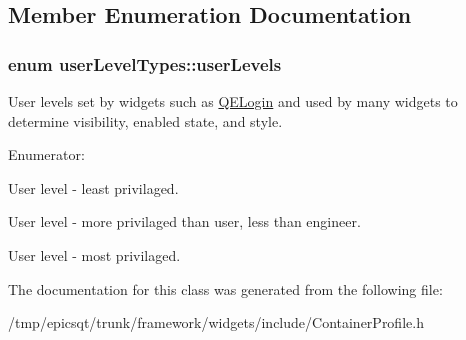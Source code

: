 \subsection{Member Enumeration Documentation}
\hypertarget{classuserLevelTypes_a033cf2a40f620286b1839dd360c8497b}{
\subsubsection[{userLevels}]{\setlength{\rightskip}{0pt plus 5cm}enum {\bf userLevelTypes::userLevels}}}
\label{classuserLevelTypes_a033cf2a40f620286b1839dd360c8497b}
User levels set by widgets such as \hyperlink{classQELogin}{QELogin} and used by many widgets to determine visibility, enabled state, and style. \begin{Desc}
\item[Enumerator: ]\par
\begin{description}
\item[{\em 
\hypertarget{classuserLevelTypes_a033cf2a40f620286b1839dd360c8497baf1de7d906a9db64a2fae68788e26ac26}{
USERLEVEL\_\-USER}
\label{classuserLevelTypes_a033cf2a40f620286b1839dd360c8497baf1de7d906a9db64a2fae68788e26ac26}
}]User level -\/ least privilaged. \item[{\em 
\hypertarget{classuserLevelTypes_a033cf2a40f620286b1839dd360c8497bad543b90d5269054979983b2793f21c14}{
USERLEVEL\_\-SCIENTIST}
\label{classuserLevelTypes_a033cf2a40f620286b1839dd360c8497bad543b90d5269054979983b2793f21c14}
}]User level -\/ more privilaged than user, less than engineer. \item[{\em 
\hypertarget{classuserLevelTypes_a033cf2a40f620286b1839dd360c8497bafd64c80b35618eb98bb9e0f085dd4449}{
USERLEVEL\_\-ENGINEER}
\label{classuserLevelTypes_a033cf2a40f620286b1839dd360c8497bafd64c80b35618eb98bb9e0f085dd4449}
}]User level -\/ most privilaged. \end{description}
\end{Desc}



The documentation for this class was generated from the following file:\begin{DoxyCompactItemize}
\item 
/tmp/epicsqt/trunk/framework/widgets/include/ContainerProfile.h\end{DoxyCompactItemize}

